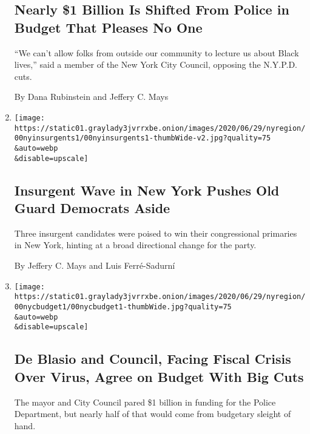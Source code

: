 \begin{enumerate}
{  \subsection{Nearly \$1 Billion Is Shifted From Police in Budget That
  Pleases No
  One}\label{nearly-1-billion-is-shifted-from-police-in-budget-that-pleases-no-one}}

  ``We can't allow folks from outside our community to lecture us about
  Black lives,'' said a member of the New York City Council, opposing
  the N.Y.P.D. cuts.

  By Dana Rubinstein and Jeffery C. Mays
\item
  \href{/2020/06/30/nyregion/ny-house-primaries.html}{}

  \texttt{[image: https://static01.graylady3jvrrxbe.onion/images/2020/06/29/nyregion/00nyinsurgents1/00nyinsurgents1-thumbWide-v2.jpg?quality=75\\\&auto=webp\\\&disable=upscale]}

  \hypertarget{insurgent-wave-in-new-york-pushes-old-guard-democrats-aside}{%
  \subsection{Insurgent Wave in New York Pushes Old Guard Democrats
  Aside}\label{insurgent-wave-in-new-york-pushes-old-guard-democrats-aside}}

  Three insurgent candidates were poised to win their congressional
  primaries in New York, hinting at a broad directional change for the
  party.

  By Jeffery C. Mays and Luis Ferré-Sadurní
\item
  \href{/2020/06/29/nyregion/nyc-budget-police.html}{}

  \texttt{[image: https://static01.graylady3jvrrxbe.onion/images/2020/06/29/nyregion/00nycbudget1/00nycbudget1-thumbWide.jpg?quality=75\\\&auto=webp\\\&disable=upscale]}

  \hypertarget{de-blasio-and-council-facing-fiscal-crisis-over-virus-agree-on-budget-with-big-cuts}{%
  \subsection{De Blasio and Council, Facing Fiscal Crisis Over Virus,
  Agree on Budget With Big
  Cuts}\label{de-blasio-and-council-facing-fiscal-crisis-over-virus-agree-on-budget-with-big-cuts}}

  The mayor and City Council pared \$1 billion in funding for the Police
  Department, but nearly half of that would come from budgetary sleight
  of hand.


\end{enumerate}
